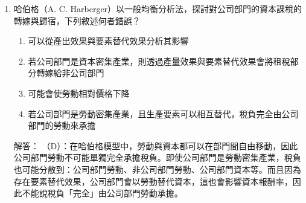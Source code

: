 \documentclass[12pt, a4paper]{article}
\begin{document}
\begin{enumerate}
    （A）：若課比例所得稅，稅率為 \(t\)，則稅後工資變成：
    \[
    (1-t)w
    \]
    預算限制式為：
    \[
    P_X X + P_Y Y = (1-t)w(T-Z)
    \]
    整理得：
    \[
    P_X X + P_Y Y + (1-t)wZ = (1-t)wT
    \]
    此時休閒的價格從 \(w\) 變成：
    \[
    (1-t)w
    \]
    所以比例所得稅會降低休閒的機會成本，使休閒相對變便宜，進而影響勞動與休閒選擇。
    因此在休閒可變動時，比例所得稅會扭曲選擇，不等同於定額稅。

    （B）：對休閒課徵從價稅，稅率為 \(t\)，則休閒價格為：
    \[
    (1+t)w
    \]
    預算限制式為：
    \[
    P_X X + P_Y Y + (1+t)wZ = wT
    \]
    此時休閒的價格從 \(w\) 變成：
    \[
    (1+t)w
    \]
    所以從價稅會增加休閒的機會成本，使休閒相對變昂貴，進而影響勞動與休閒選擇。

    （C）：對所有財貨（不含休閒）課徵單一稅率的貨物稅，稅率為 \(t\)，則財貨價格為：
    \[
    (1+t)P_X, (1+t)P_Y
    \]
    預算限制式為：
    \[
    (1+t)P_X X + (1+t)P_Y Y + wZ = wT
    \]
    也可以寫為
    \[
    P_X X + P_Y Y + \frac{w}{(1+t)}Z = wT
    \]
    此時財貨的價格從 1 變成：
    \[
    (1+t)P_X, (1+t)P_Y
    \]
    也改變了財貨跟休閒的相對價格，影響財貨與休閒選擇。

    \item 哈伯格（A. C. Harberger）以一般均衡分析法，探討對公司部門的資本課稅的轉嫁與歸宿，下列敘述何者錯誤？
    \begin{enumerate}[label=\Alph*.]
        \item 可以從產出效果與要素替代效果分析其影響
        \item 若公司部門是資本密集產業，則透過產量效果與要素替代效果會將租稅部分轉嫁給非公司部門
        \item 可能會使勞動相對價格下降
        \item 若公司部門是勞動密集產業，且生產要素可以相互替代，稅負完全由公司部門的勞動來承擔
    \end{enumerate}
    解答：
    （D）：在哈伯格模型中，勞動與資本都可以在部門間自由移動，因此公司部門勞動不可能單獨完全承擔稅負。即使公司部門是勞動密集產業，稅負也可能分散到：公司部門勞動、非公司部門勞動、公司部門資本等。而且因為存在要素替代效果，公司部門會以勞動替代資本，這也會影響資本報酬率，因此不能說稅負「完全」由公司部門勞動承擔。


\end{enumerate}
\end{document}
